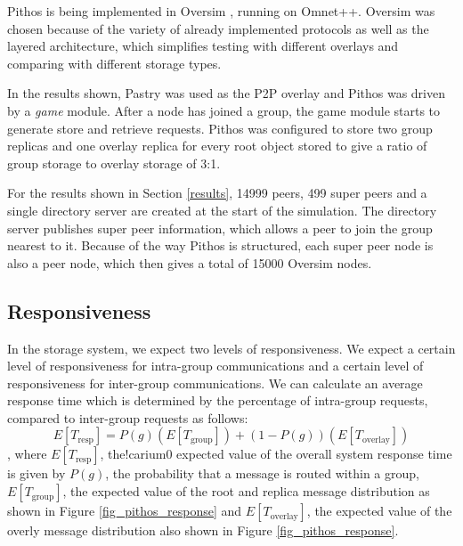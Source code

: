 \documentclass[10pt,a4paper,conference]{IEEEtran}
\begin{document}
Pithos is being implemented in Oversim \cite{OverSim_2007}, running on Omnet++. Oversim was chosen because of the variety of already implemented
protocols as well as the layered architecture, which simplifies testing with different overlays and comparing with different storage types.

In the results shown, Pastry was used as the P2P overlay and Pithos was driven by a \emph{game} module. After a node has joined a group, the game
module starts to generate store and retrieve requests. Pithos was configured to store two group replicas and one overlay replica for every root
object stored to give a ratio of group storage to overlay storage of 3:1.

For the results shown in Section \ref{results}, 14999 peers, 499 super peers and a single directory server are created at the start of the
simulation. The directory server publishes super peer information, which allows a peer to join the group nearest to it. Because of the way Pithos is
structured, each super peer node is also a peer node, which then gives a total of 15000 Oversim nodes.

\subsection{Responsiveness}

In the storage system, we expect two levels of responsiveness. We expect a certain level of responsiveness for intra-group communications and a
certain level of responsiveness for inter-group communications. We can calculate an average response time which is determined by the percentage of
intra-group requests, compared to inter-group requests as follows:
%
\begin{equation}\label{expected_response_time}
    E[T_{\textrm{resp}}] = P(g)\left(E\left[T_{\textrm{group}}\right]\right) + \left(1 - P(g)\right)\left(E\left[T_{\textrm{overlay}}\right]\right)
\end{equation}
%
, where $E[T_{\textrm{resp}}]$, the!carium0
 expected value of the overall system response time is given by $P(g)$, the probability that a message is
routed within a group, $E\left[T_{\textrm{group}}\right]$, the expected value of the root and replica message distribution as shown in Figure
\ref{fig_pithos_response} and $E\left[T_{\textrm{overlay}}\right]$, the expected value of the overly message distribution also shown in Figure
\ref{fig_pithos_response}.
\end{document}
